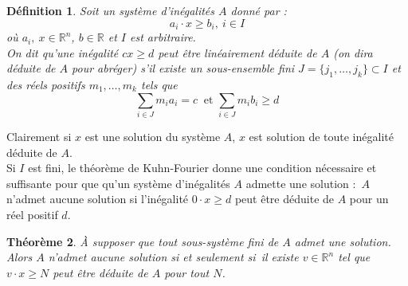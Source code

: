 \documentclass[11pt]{report}
\newenvironment{boxtheorem}
{\begin{tcolorbox}
		[enhanced jigsaw,breakable,pad at break*=2mm,
		colback=black!5,colframe=bleueLeger]}
	{\end{tcolorbox}}
\newenvironment{boxdefinition}
{\begin{tcolorbox}
		[enhanced jigsaw,breakable,pad at break*=1mm,
		colback=black!5!white,boxrule=0pt,frame hidden,
		borderline west={1.5mm}{-2mm}{blue}]}
	{\end{tcolorbox}}
\theoremstyle{styletheorem}
\newtheorem{theoreme}{Théorème}[section]
\newenvironment{theorem}
{\vspace*{0.3cm}\begin{boxtheorem}\begin{theoreme}}{\end{theoreme}\end{boxtheorem}\vspace*{0.3cm}}
\theoremstyle{styledef}
\newtheorem{definitions}[theoreme]{Définition}
\theoremstyle{remark}
\newenvironment{definition}{\vspace*{0.3cm}\begin{boxdefinition}\begin{definitions}}{\end{definitions}\end{boxdefinition}\vspace*{0.3cm}}
\newcommand{\ssi}{si et seulement si\  }
\newcommand{\R}{\ensuremath{\mathbb{R}}}
\begin{document}
\begin{definition}
	Soit un système d'inégalités $A$ donné par :$$a_i\cdot  x \geq b_i,\ i \in I$$ où $a_i,\ x \in \R^n$, $b \in \R$ et $I$ est arbitraire.\\
	On dit qu'une inégalité $cx \geq d$ peut être linéairement déduite de $A$ (on dira déduite de $A$ pour abréger) s'il existe un sous-ensemble fini $J= \lbrace j_1,\dots,j_k\rbrace \subset I$ et des réels positifs $m_1, \dots,m_k$ tels que $$\sum_{i \in J} m_i a_i =c \ \text{ et } \sum_{i \in J} m_i b_i \geq d$$
\end{definition}
Clairement si $x$ est une solution du système $A$, $x$ est solution de toute inégalité déduite de $A$.\\
Si $I$ est fini, le théorème de Kuhn-Fourier donne une condition nécessaire et suffisante pour que qu'un système d'inégalités $A$ admette une solution $\colon$ $A$ n'admet aucune solution si l'inégalité $0\cdot x \geq d$ peut être déduite de $A$ pour un réel positif $d$.
\begin{theorem}
	À supposer que tout sous-système fini de $A$ admet une solution. Alors $A$ n'admet aucune solution \ssi il existe $v \in \R^n$ tel que $v\cdot x \geq N$ peut être déduite de $A$ pour tout $N$.
\end{theorem}
\end{document}
